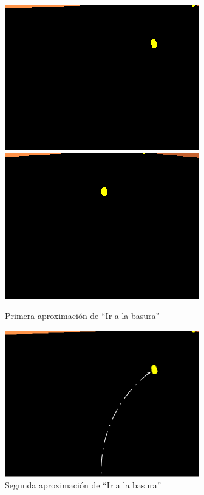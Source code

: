\begin{figure}[htp]
\begin{center}
\includegraphics[scale=0.5]{comportamientos/basura.png}
\includegraphics[scale=0.5]{comportamientos/basuraenfocada.png}
\caption{Primera aproximaci\'on de ``Ir a la basura''}
\label{fig:papproachgoto}
\end{center}
\end{figure}

\begin{figure}[htp]
\begin{center}
\includegraphics[scale=0.5]{comportamientos/basuraAlt.png}
\caption{Segunda aproximaci\'on de ``Ir a la basura''}
\label{fig:sapproachgoto}
\end{center}
\end{figure}

